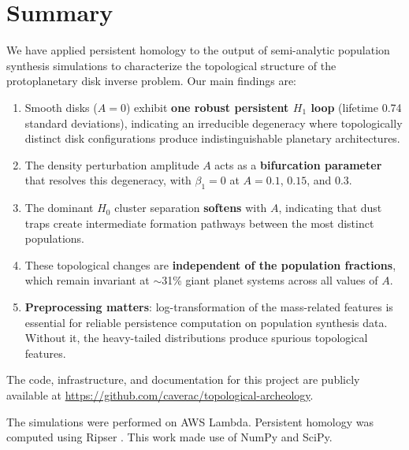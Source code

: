 \documentclass[twocolumn]{aastex631}
\begin{document}
\section{Summary}
\label{sec:summary}

We have applied persistent homology to the output of semi-analytic population
synthesis simulations to characterize the topological structure of the
protoplanetary disk inverse problem.  Our main findings are:

\begin{enumerate}
\item Smooth disks ($A = 0$) exhibit \textbf{one robust persistent $H_1$
loop} (lifetime 0.74 standard deviations), indicating an irreducible
degeneracy where topologically distinct disk configurations produce
indistinguishable planetary architectures.

\item The density perturbation amplitude $A$ acts as a \textbf{bifurcation
parameter} that resolves this degeneracy, with $\beta_1 = 0$ at $A = 0.1$,
$0.15$, and $0.3$.

\item The dominant $H_0$ cluster separation \textbf{softens} with $A$,
indicating that dust traps create intermediate formation pathways between
the most distinct populations.

\item These topological changes are \textbf{independent of the population
fractions}, which remain invariant at $\sim$31\% giant planet systems across
all values of $A$.

\item \textbf{Preprocessing matters}: log-transformation of the mass-related
features is essential for reliable persistence computation on population
synthesis data.  Without it, the heavy-tailed distributions produce spurious
topological features.
\end{enumerate}

The code, infrastructure, and documentation for this project are publicly
available at \url{https://github.com/caverac/topological-archeology}.

\begin{acknowledgments}
The simulations were performed on AWS Lambda.  Persistent homology was computed
using Ripser \citep{Bauer2021}.  This work made use of NumPy and SciPy.
\end{acknowledgments}


\end{document}
